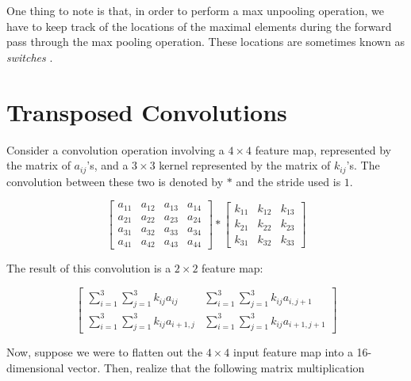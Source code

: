\documentclass{article}[a4paper]
\begin{document}
One thing to note is that, in order to perform a max unpooling operation, we have to keep track of the locations of the maximal elements during the forward pass through the max pooling operation. These locations are sometimes known as \textit{switches} \cite{zeiler2014visualizing}.

\section{Transposed Convolutions}
Consider a convolution operation involving a $4 \times 4$ feature map, represented by the matrix of $a_{ij}$'s, and a $3 \times 3$ kernel represented by the matrix of $k_{ij}$'s. The convolution between these two is denoted by $*$ and the stride used is $1$.

\begin{equation}
	\label{orig-convolution}
	\begin{bmatrix}
		a_{11} & a_{12} & a_{13} & a_{14} \\
		a_{21} & a_{22} & a_{23} & a_{24} \\
		a_{31} & a_{32} & a_{33} & a_{34} \\
		a_{41} & a_{42} & a_{43} & a_{44}
	\end{bmatrix} *
	\begin{bmatrix}
		k_{11} & k_{12} & k_{13} \\
		k_{21} & k_{22} & k_{23} \\
		k_{31} & k_{32} & k_{33}
	\end{bmatrix}
\end{equation}

The result of this convolution is a $2 \times 2$ feature map:

\begin{equation*}
	\renewcommand{\arraystretch}{1.5}
	\begin{bmatrix}
		\sum_{i=1}^3 \sum_{j=1}^3 k_{ij} a_{ij} & \sum_{i=1}^3 \sum_{j=1}^3 k_{ij} a_{i,j{+}1} \\
		\sum_{i=1}^3 \sum_{j=1}^3 k_{ij} a_{i{+}1,j} & \sum_{i=1}^3 \sum_{j=1}^3 k_{ij} a_{i{+}1,j{+}1}
	\end{bmatrix}
\end{equation*}

Now, suppose we were to flatten out the $4 \times 4$ input feature map into a 16-dimensional vector. Then, realize that the following matrix multiplication
\end{document}
